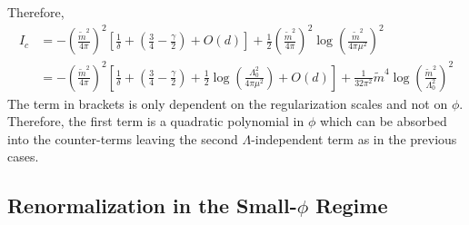 \documentclass[12pt]{article}
\begin{document}
Therefore,
\begin{align*}
I_c & = - \left( \frac{\tilde{m}^2}{4 \pi} \right)^2 \left[ \frac{1}{\delta} + \left( \frac{3}{4} - \frac{\gamma}{2} \right) + O(d) \right] + \frac{1}{2} \left( \frac{\tilde{m}^2}{4 \pi} \right)^2 \log{\left( \frac{\tilde{m}^2}{4 \pi \mu^2} \right)^2}
\\
& = - \left( \frac{\tilde{m}^2}{4 \pi} \right)^2 \left[ \frac{1}{\delta} + \left( \frac{3}{4} - \frac{\gamma}{2} \right) + \frac{1}{2} \log{\left( \frac{\Lambda_0^2}{4 \pi \mu^2} \right)} + O(d) \right] + \frac{1}{32 \pi^2} \tilde{m}^4 \log{\left( \frac{\tilde{m}^2}{\Lambda_0^2} \right)^2}
\end{align*}
The term in brackets is only dependent on the regularization scales and not on $\phi$. Therefore, the first term is a quadratic polynomial in $\phi$ which can be absorbed into the counter-terms leaving the second $\Lambda$-independent term as in the previous cases. 

\subsection{Renormalization in the Small-$\phi$ Regime}
\end{document}
